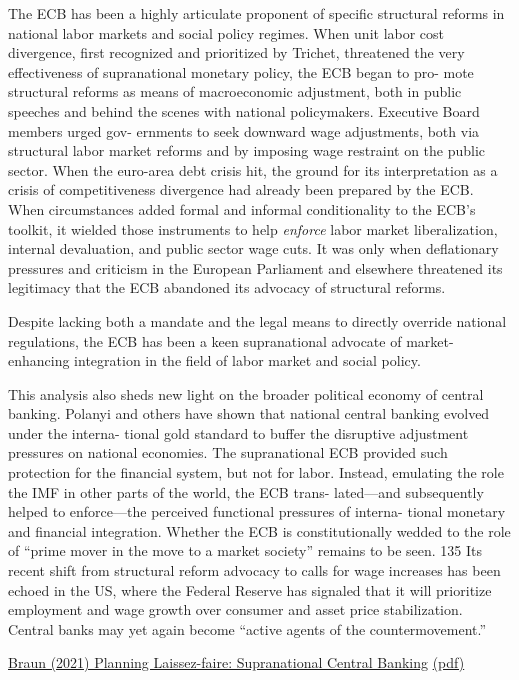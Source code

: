 \documentclass[
]{book}
\begin{document}
The ECB has been a highly articulate proponent of specific structural reforms
in national labor markets and social policy regimes.
When unit labor cost divergence, first recognized and prioritized by Trichet,
threatened the very effectiveness of supranational monetary policy, the ECB began to pro-
mote structural reforms as means of macroeconomic adjustment, both in public speeches
and behind the scenes with national policymakers.
Executive Board members urged gov-
ernments to seek downward wage adjustments, both via structural labor market reforms
and by imposing wage restraint on the public sector.
When the euro-area debt crisis hit,
the ground for its interpretation as a crisis of competitiveness divergence had already been
prepared by the ECB.
When circumstances added formal and informal conditionality to
the ECB's toolkit, it wielded those instruments to help \emph{enforce}
labor market liberalization, internal devaluation, and public sector wage cuts.
It was only when deflationary pressures
and criticism in the European Parliament and elsewhere threatened its legitimacy that
the ECB abandoned its advocacy of structural reforms.

Despite lacking both a mandate and the legal
means to directly override national regulations, the ECB has been a keen supranational
advocate of market-enhancing integration in the field of labor market and social policy.

This analysis also sheds new light on the broader political economy of central banking.
Polanyi and others have shown that national central banking evolved under the interna-
tional gold standard to buffer the disruptive adjustment pressures on national economies.
The supranational ECB provided such protection for the financial system, but not for
labor. Instead, emulating the role the IMF in other parts of the world, the ECB trans-
lated---and subsequently helped to enforce---the perceived functional pressures of interna-
tional monetary and financial integration. Whether the ECB is constitutionally wedded
to the role of ``prime mover in the move to a market society'' remains to be seen. 135 Its
recent shift from structural reform advocacy to calls for wage increases has been echoed
in the US, where the Federal Reserve has signaled that it will prioritize employment and
wage growth over consumer and asset price stabilization. Central banks may yet again
become ``active agents of the countermovement.''

\href{https://osf.io/preprints/socarxiv/dp3nv}{Braun (2021) Planning Laissez-faire: Supranational Central Banking}
\href{pdf/Braun_2021_Planning_laissez-faire.pdf}{(pdf)}
\end{document}
